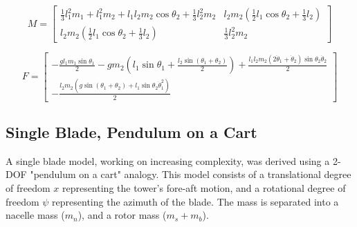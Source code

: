 \documentclass[onecolumn,draftcls]{IEEEtran}
\begin{document}
\begin{equation}
    \label{eq:double_pendulum_rigid_mass_matrix} M =
    \begin{bmatrix}
        \frac{1}{3} l_1^2 m_1 + l_1^2 m_2 + l_1 l_2 m_2 \cos\theta_2 + \frac{1}{3} l_2^2 m_2 &
        l_2 m_2 \left(\frac{1}{2} l_1 \cos\theta_2 + \frac{1}{3} l_2\right)                    \\
        l_2 m_2 \left(\frac{1}{2} l_1 \cos\theta_2 + \frac{1}{3} l_2\right)                  &
        \frac{1}{3} l_2^2 m_2
    \end{bmatrix}
\end{equation}

\begin{equation}
    \label{eq:double_pendulum_rigid_forcing_terms} F =
    \begin{bmatrix}
        -\frac{g l_1 m_1 \sin\theta_1}{2} - g m_2 \left(l_1 \sin\theta_1 + \frac{l_2 \sin(\theta_1 + \theta_2)}{2}\right) + \frac{l_1 l_2 m_2 (2 \dot{\theta}_1 + \dot{\theta}_2) \sin\theta_2 \dot{\theta}_2}{2} \\
        -\frac{l_2 m_2 \left(g \sin(\theta_1 + \theta_2) + l_1 \sin\theta_2 \dot{\theta}_1^2\right)}{2}
    \end{bmatrix}
\end{equation}



















\subsection*{Single Blade, Pendulum on a Cart}
A single blade model, working on increasing complexity, was derived using a 2-DOF "pendulum on a cart" analogy. This model consists of a translational degree of freedom $x$ representing the tower's fore-aft motion, and a rotational degree of freedom $\psi$ representing the azimuth of the blade. The mass is separated into a nacelle mass ($m_n$), and a rotor mass ($m_s + m_b$).
\end{document}
